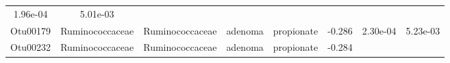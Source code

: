 \documentclass[11pt,]{article}
\begin{document}
\begin{longtable}[]{@{}cccccccc@{}}
\begin{minipage}[t]{0.08\columnwidth}
1.96e-04\strut
\end{minipage} & \begin{minipage}[t]{0.08\columnwidth}\centering\strut
5.01e-03\strut
\end{minipage}\tabularnewline
\begin{minipage}[t]{0.08\columnwidth}\centering\strut
Otu00179\strut
\end{minipage} & \begin{minipage}[t]{0.15\columnwidth}\centering\strut
Ruminococcaceae\strut
\end{minipage} & \begin{minipage}[t]{0.15\columnwidth}\centering\strut
Ruminococcaceae\strut
\end{minipage} & \begin{minipage}[t]{0.08\columnwidth}\centering\strut
adenoma\strut
\end{minipage} & \begin{minipage}[t]{0.09\columnwidth}\centering\strut
propionate\strut
\end{minipage} & \begin{minipage}[t]{0.07\columnwidth}\centering\strut
-0.286\strut
\end{minipage} & \begin{minipage}[t]{0.08\columnwidth}\centering\strut
2.30e-04\strut
\end{minipage} & \begin{minipage}[t]{0.08\columnwidth}\centering\strut
5.23e-03\strut
\end{minipage}\tabularnewline
\begin{minipage}[t]{0.08\columnwidth}\centering\strut
Otu00232\strut
\end{minipage} & \begin{minipage}[t]{0.15\columnwidth}\centering\strut
Ruminococcaceae\strut
\end{minipage} & \begin{minipage}[t]{0.15\columnwidth}\centering\strut
Ruminococcaceae\strut
\end{minipage} & \begin{minipage}[t]{0.08\columnwidth}\centering\strut
adenoma\strut
\end{minipage} & \begin{minipage}[t]{0.09\columnwidth}\centering\strut
propionate\strut
\end{minipage} & \begin{minipage}[t]{0.07\columnwidth}\centering\strut
-0.284\strut
\end{minipage} & \begin{minipage}[t]{0.08\columnwidth}\centering\strut

\end{minipage}
\end{longtable}
\end{document}
